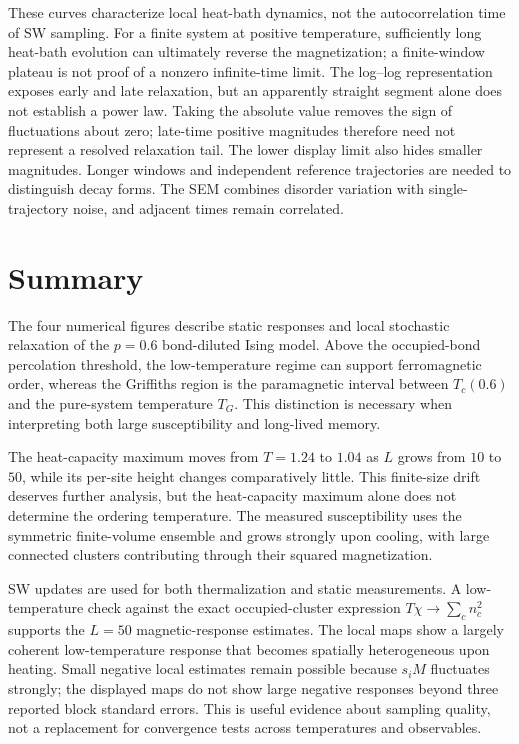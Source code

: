 \documentclass[a4paper,11pt]{article}
\begin{document}
These curves characterize local heat-bath dynamics, not the autocorrelation time of SW sampling.
For a finite system at positive temperature, sufficiently long heat-bath evolution can ultimately
reverse the magnetization; a finite-window plateau is not proof of a nonzero infinite-time limit.
The log--log representation exposes early and late relaxation, but an apparently straight segment
alone does not establish a power law. Taking the absolute value removes the sign of fluctuations
about zero; late-time positive magnitudes therefore need not represent a resolved relaxation tail.
The lower display limit also hides smaller magnitudes. Longer windows and independent reference
trajectories are needed to distinguish decay forms. The SEM combines disorder variation with
single-trajectory noise, and adjacent times remain correlated.

\clearpage
\section{Summary}
The four numerical figures describe static responses and local stochastic relaxation of the
$p=0.6$ bond-diluted Ising model. Above the occupied-bond percolation threshold, the low-temperature
regime can support ferromagnetic order, whereas the Griffiths region is the paramagnetic interval
between $T_c(0.6)$ and the pure-system temperature $T_G$. This distinction is necessary when
interpreting both large susceptibility and long-lived memory.

The heat-capacity maximum moves from $T=1.24$ to $1.04$ as $L$ grows from $10$ to $50$, while
its per-site height changes comparatively little. This finite-size drift deserves further analysis,
but the heat-capacity maximum alone does not determine the ordering temperature. The measured
susceptibility uses the symmetric finite-volume ensemble and grows strongly upon cooling, with
large connected clusters contributing through their squared magnetization.

SW updates are used for both thermalization and static measurements. A low-temperature check
against the exact occupied-cluster expression $T\chi\to\sum_c n_c^2$ supports the $L=50$
magnetic-response estimates. The local maps show a largely coherent low-temperature response that
becomes spatially heterogeneous upon heating. Small negative local estimates remain possible
because $s_iM$ fluctuates strongly; the displayed maps do not show large negative responses beyond
three reported block standard errors. This is useful evidence about sampling quality, not a
replacement for convergence tests across temperatures and observables.
\end{document}
